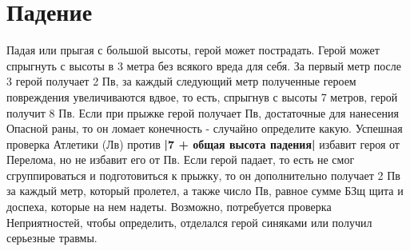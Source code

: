 \section{Падение}
Падая или прыгая с большой высоты, герой может пострадать. Герой может спрыгнуть с высоты в 3 метра без всякого вреда для себя. За первый метр после 3 герой получает 2 Пв, за каждый следующий метр полученные героем повреждения увеличиваются вдвое, то есть, спрыгнув с высоты 7 метров, герой получит 8 Пв. Если при прыжке герой получает Пв, достаточные для нанесения Опасной раны, то он ломает конечность - случайно определите какую. Успешная проверка Атлетики (Лв) против \textbf{|7 + общая высота падения|} избавит героя от Перелома, но не избавит его от Пв.
\newline
Если герой падает, то есть не смог сгруппироваться и подготовиться к прыжку, то он дополнительно получает 2 Пв за каждый метр, который пролетел, а также число Пв, равное сумме БЗщ щита и доспеха, которые на нем надеты. Возможно, потребуется проверка Неприятностей, чтобы определить, отделался герой синяками или получил серьезные травмы.
